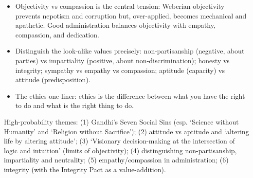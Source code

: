 \begin{itemize}
\item Objectivity vs compassion is the central tension: Weberian objectivity prevents nepotism and corruption but, over-applied, becomes mechanical and apathetic. Good administration balances objectivity with empathy, compassion, and dedication.
\item Distinguish the look-alike values precisely: non-partisanship (negative, about parties) vs impartiality (positive, about non-discrimination); honesty vs integrity; sympathy vs empathy vs compassion; aptitude (capacity) vs attitude (predisposition).
\item The ethics one-liner: ethics is the difference between what you have the right to do and what is the right thing to do.
\end{itemize}

\begin{PYQLink}
High-probability themes: (1) Gandhi's Seven Social Sins (esp. `Science without Humanity' and `Religion without Sacrifice'); (2) attitude vs aptitude and `altering life by altering attitude'; (3) `Visionary decision-making at the intersection of logic and intuition' (limits of objectivity); (4) distinguishing non-partisanship, impartiality and neutrality; (5) empathy/compassion in administration; (6) integrity (with the Integrity Pact as a value-addition).
\end{PYQLink}
